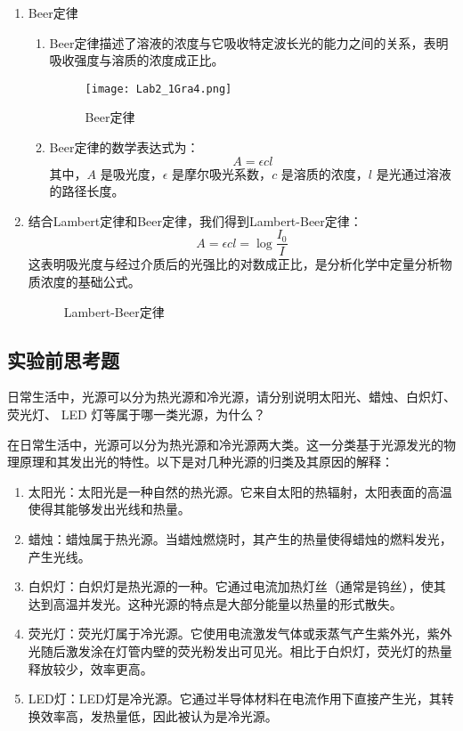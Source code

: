 \documentclass[dvipsnames, svgnames,a4paper,11pt]{article}
\begin{document}
\begin{enumerate}
		\item Beer定律
		\begin{enumerate}
			\item Beer定律描述了溶液的浓度与它吸收特定波长光的能力之间的关系，表明吸收强度与溶质的浓度成正比。
			
			\begin{figure}[htbp]
				\centering
				\texttt{[image: Lab2\_1Gra4.png]}
				\caption{Beer定律}
				\label{fig:fig4}
			\end{figure}
			
			\item Beer定律的数学表达式为：
			\[ A = \epsilon c l \]
			其中，\(A\) 是吸光度，\(\epsilon\) 是摩尔吸光系数，\(c\) 是溶质的浓度，\(l\) 是光通过溶液的路径长度。
		\end{enumerate}
		
		\item 结合Lambert定律和Beer定律，我们得到Lambert-Beer定律：
		\[ A = \epsilon c l = \log \frac{I_0}{I} \]
		这表明吸光度与经过介质后的光强比的对数成正比，是分析化学中定量分析物质浓度的基础公式。
		
		\begin{figure}[htbp]
			\centering
			\caption{Lambert-Beer定律}
			\label{fig:fig5}			
		\end{figure}
		
	\end{enumerate}
	
	
	
	\subsection{实验前思考题}
	
	\begin{question}
		日常生活中，光源可以分为热光源和冷光源，请分别说明太阳光、蜡烛、白炽灯、荧光灯、 LED 灯等属于哪一类光源，为什么？
	\end{question}
	在日常生活中，光源可以分为热光源和冷光源两大类。这一分类基于光源发光的物理原理和其发出光的特性。以下是对几种光源的归类及其原因的解释：
	
	\begin{enumerate}
		\item 太阳光：太阳光是一种自然的热光源。它来自太阳的热辐射，太阳表面的高温使得其能够发出光线和热量。
		\item 蜡烛：蜡烛属于热光源。当蜡烛燃烧时，其产生的热量使得蜡烛的燃料发光，产生光线。
		\item 白炽灯：白炽灯是热光源的一种。它通过电流加热灯丝（通常是钨丝），使其达到高温并发光。这种光源的特点是大部分能量以热量的形式散失。
		\item 荧光灯：荧光灯属于冷光源。它使用电流激发气体或汞蒸气产生紫外光，紫外光随后激发涂在灯管内壁的荧光粉发出可见光。相比于白炽灯，荧光灯的热量释放较少，效率更高。
		\item LED灯：LED灯是冷光源。它通过半导体材料在电流作用下直接产生光，其转换效率高，发热量低，因此被认为是冷光源。
	\end{enumerate}
	
\end{document}
